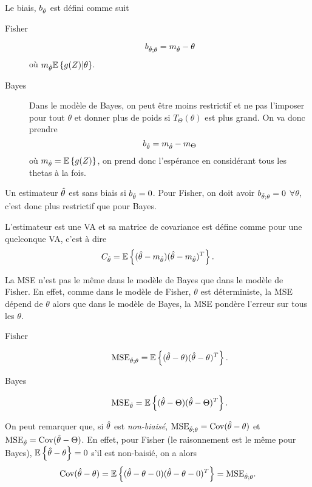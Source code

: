 \begin{mydef}
  Le biais, $b_{\hat{\theta}}$ est défini comme suit
  \begin{description}
    \item[Fisher]
      \[ b_{\hat{\theta};\theta} = m_{\hat{\theta}} - \theta \]
      où
      $m_{\hat{\theta}} \mathbb{E}\left\{g(Z)|\theta\right\}$.
    \item[Bayes] Dans le modèle de Bayes, on peut être moins restrictif et
      ne pas l'imposer pour tout $\theta$ et donner plus de poids
      si $T_\Theta(\theta)$ est plus grand.
      On va donc prendre
      \[ b_{\hat{\theta}} = m_{\hat{\theta}} - m_\Theta \]
      où $m_{\hat{\theta}} = \mathbb{E}\left\{g(Z)\right\}$, on prend donc l'espérance en considérant
      tous les thetas à la fois.
  \end{description}
  Un estimateur $\hat{\theta}$ est sans biais si $b_{\hat{\theta}} = 0$.
  Pour Fisher, on doit avoir $b_{\hat{\theta};\theta} = 0$ $\forall \theta$,
  c'est donc plus restrictif que pour Bayes.
\end{mydef}

\begin{mydef}
  L'estimateur est une VA et sa matrice de covariance est défine comme pour une quelconque VA,
  c'est à dire
  \[ C_{\hat{\theta}} = \mathbb{E}\left\{(\hat{\theta} - m_{\hat{\theta}})(\hat{\theta} - m_{\hat{\theta}})^T\right\}. \]
\end{mydef}

\begin{mydef}
  La MSE n'est pas le même dans le modèle de Bayes que dans le modèle de Fisher.
  En effet, comme dans le modèle de Fisher, $\theta$ est déterministe,
  la MSE dépend de $\theta$ alors que dans le modèle de Bayes,
  la MSE pondère l'erreur sur tous les $\theta$.
  \begin{description}
    \item[Fisher]
      \[ \mathrm{MSE}_{\hat{\theta};\theta} = \mathbb{E}\left\{(\hat{\theta} - \theta)(\hat{\theta}-\theta)^T\right\}. \]
    \item[Bayes]
      \[ \mathrm{MSE}_{\hat{\theta}} = \mathbb{E}\left\{(\hat{\theta} - \Theta)(\hat{\theta}-\Theta)^T\right\}. \]
  \end{description}
\end{mydef}

On peut remarquer que,
si $\hat{\theta}$ est \emph{non-biaisé},
$\mathrm{MSE}_{\hat{\theta};\theta} = \operatorname{Cov}(\hat{\theta} - \theta)$ et $\mathrm{MSE}_{\hat{\theta}} = \operatorname{Cov}(\hat{\theta} - \Theta)$.
En effet, pour Fisher (le raisonnement est le même pour Bayes),
$\mathbb{E}\left\{\hat{\theta} - \theta\right\} = 0$ s'il est non-baisié,
on a alors
\[ \operatorname{Cov}(\hat{\theta} - \theta) = \mathbb{E}\left\{(\hat{\theta}-\theta - 0)(\hat{\theta}-\theta - 0)^T\right\} = \mathrm{MSE}_{\hat{\theta};\theta}. \]

